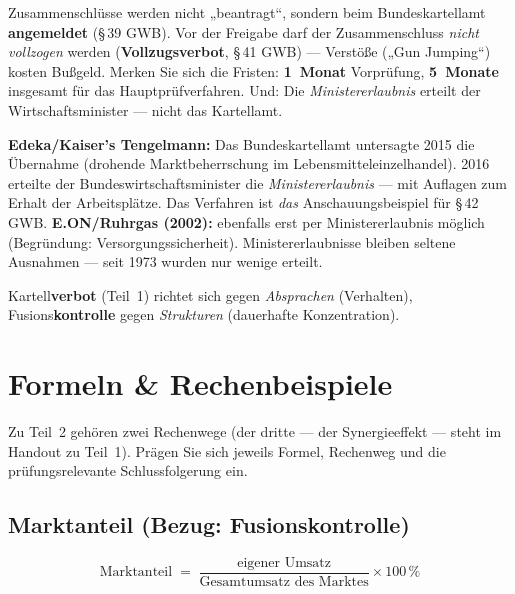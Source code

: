 \documentclass[11pt, a4paper]{article}
\begin{document}
\begin{achtung}[title={\bfseries Prüfungsfalle: „Genehmigung`` vs. Anmeldung}]
Zusammenschlüsse werden nicht „beantragt``, sondern beim Bundeskartellamt
\textbf{angemeldet} (\S\,39 GWB). Vor der Freigabe darf der Zusammenschluss
\emph{nicht vollzogen} werden (\textbf{Vollzugsverbot}, \S\,41 GWB) --- Verstöße
(„Gun Jumping``) kosten Bußgeld. Merken Sie sich die Fristen: \textbf{1~Monat}
Vorprüfung, \textbf{5~Monate} insgesamt für das Hauptprüfverfahren. Und: Die
\emph{Ministererlaubnis} erteilt der Wirtschaftsminister --- nicht das Kartellamt.
\end{achtung}

\begin{beispiel}[title={\bfseries Praxisfälle zur Fusionskontrolle}]
\textbf{Edeka/Kaiser's Tengelmann:} Das Bundeskartellamt untersagte 2015 die Übernahme
(drohende Marktbeherrschung im Lebensmitteleinzelhandel). 2016 erteilte der
Bundeswirtschaftsminister die \emph{Ministererlaubnis} --- mit Auflagen zum Erhalt der
Arbeitsplätze. Das Verfahren ist \emph{das} Anschauungsbeispiel für \S\,42 GWB.
\textbf{E.ON/Ruhrgas (2002):} ebenfalls erst per Ministererlaubnis möglich
(Begründung: Versorgungssicherheit). Ministererlaubnisse bleiben seltene
Ausnahmen --- seit 1973 wurden nur wenige erteilt.
\end{beispiel}

\begin{merksatz}
Kartell\textbf{verbot} (Teil~1) richtet sich gegen \emph{Absprachen} (Verhalten),
Fusions\textbf{kontrolle} gegen \emph{Strukturen} (dauerhafte Konzentration).
\end{merksatz}

\section{Formeln \& Rechenbeispiele}

Zu Teil~2 gehören zwei Rechenwege (der dritte --- der Synergieeffekt --- steht im
Handout zu Teil~1). Prägen Sie sich jeweils Formel, Rechenweg und die prüfungsrelevante
Schlussfolgerung ein.

\subsection{Marktanteil (Bezug: Fusionskontrolle)}

\[
\textrm{Marktanteil} \;=\; \frac{\textrm{eigener Umsatz}}{\textrm{Gesamtumsatz des Marktes}} \times 100\,\%
\]
\end{document}
